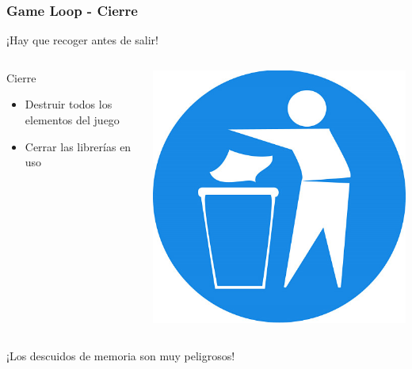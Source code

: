 \documentclass{beamer}
\begin{document}
\begin{frame}
\begin{columns}[c]
	\end{columns}
	
\end{frame}

\begin{frame}
	\frametitle{Game Loop - Cierre}
	
	¡Hay que recoger antes de salir!
	
	\begin{columns}[c]
	\column{175pt}
		
	\begin{block}{Cierre}
		\begin{itemize}
			\item Destruir todos los elementos del juego
			\item Cerrar las librerías en uso
		\end{itemize}            
	\end{block}
	
	\column{125pt}
	
	\begin{center}
		\includegraphics[scale=0.25]{img/tidy.jpg}
	\end{center}	
	
	\end{columns}
	
	\begin{center}
	    ¡Los descuidos de memoria son muy peligrosos!
	\end{center}
	
\end{frame}
\end{document}
